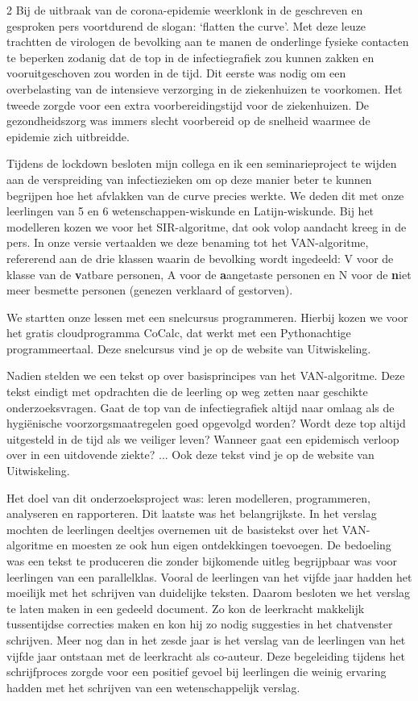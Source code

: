 \begin{multicols}{2}
Bij de uitbraak van de corona-epidemie weerklonk in de geschreven en gesproken pers voortdurend de slogan: `flatten the curve'. Met deze leuze trachtten de virologen de bevolking aan te manen de onderlinge fysieke contacten te beperken zodanig dat de top in de infectiegrafiek zou kunnen zakken en vooruitgeschoven zou worden in de tijd. Dit eerste was nodig om een overbelasting van de intensieve verzorging in de ziekenhuizen te voorkomen. Het tweede zorgde voor een extra voorbereidingstijd voor de ziekenhuizen. De gezondheidszorg was immers slecht voorbereid op de snelheid waarmee de epidemie zich uitbreidde.

Tijdens de lockdown besloten mijn collega en ik een seminarieproject te wijden aan de verspreiding van infectiezieken om op deze manier beter te kunnen begrijpen hoe het afvlakken van de curve precies werkte. We deden dit met onze leerlingen van 5 en 6 wetenschappen-wiskunde en Latijn-wiskunde. Bij het modelleren kozen we voor het SIR-algoritme, dat ook volop aandacht kreeg in de pers. In onze versie vertaalden we deze benaming tot het VAN-algoritme, refererend aan de drie klassen waarin de bevolking wordt ingedeeld: V voor de klasse van de \textbf{v}atbare personen, A voor de \textbf{a}angetaste personen en N voor de \textbf{n}iet meer besmette personen (genezen verklaard of gestorven).

We startten onze lessen met een snelcursus programmeren. Hierbij kozen we voor het gratis cloudprogramma CoCalc, dat werkt met een Pythonachtige programmeertaal. Deze snelcursus vind je op de website van Uitwiskeling. 

Nadien stelden we een tekst op over basisprincipes van het VAN-algoritme. Deze tekst eindigt met opdrachten die de leerling op weg zetten naar geschikte onderzoeksvragen. Gaat de top van de infectiegrafiek altijd naar omlaag als de hygiënische voorzorgsmaatregelen goed opgevolgd worden? Wordt deze top altijd uitgesteld in de tijd als we veiliger leven? Wanneer gaat een epidemisch verloop over in een uitdovende ziekte? ... Ook deze tekst vind je op de website van Uitwiskeling. 

Het doel van dit onderzoeksproject was: leren modelleren, programmeren, analyseren en rapporteren. Dit laatste was het belangrijkste. In het verslag mochten de leerlingen deeltjes overnemen uit de basistekst over het VAN-algoritme en moesten ze ook hun eigen ontdekkingen toevoegen. De bedoeling was een tekst te produceren die zonder bijkomende uitleg begrijpbaar was voor leerlingen van een parallelklas. Vooral de leerlingen van het vijfde jaar hadden het moeilijk met het schrijven van duidelijke teksten. Daarom besloten we het verslag te laten maken in een gedeeld document. Zo kon de leerkracht makkelijk tussentijdse correcties maken en kon hij zo nodig suggesties in  het chatvenster schrijven. Meer nog dan in het zesde jaar is het verslag van de leerlingen van het vijfde jaar ontstaan met de leerkracht als co-auteur. Deze begeleiding tijdens het schrijfproces zorgde voor een positief gevoel bij leerlingen die weinig ervaring hadden met het schrijven van een wetenschappelijk verslag.


\end{multicols}
